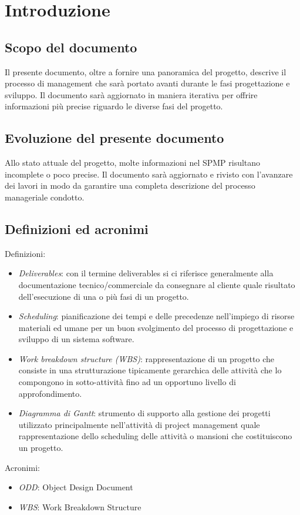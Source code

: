 \chapter{Introduzione}

\section{Scopo del documento}
		
Il presente documento, oltre a fornire una panoramica del progetto, descrive il processo di management che sarà portato avanti durante le fasi progettazione e sviluppo. Il documento sarà aggiornato in maniera iterativa per offrire informazioni più precise riguardo le diverse fasi del progetto. 


\section{Evoluzione del presente documento}

Allo stato attuale del progetto, molte informazioni nel SPMP risultano incomplete o poco precise. Il documento sarà aggiornato e rivisto con l'avanzare dei lavori in modo da garantire una completa descrizione del processo manageriale condotto.


\section{Definizioni ed acronimi}

Definizioni:			
\begin{itemize}
\item \emph{Deliverables}: con il termine deliverables si ci riferisce generalmente alla documentazione tecnico/commerciale da consegnare al cliente quale risultato dell'esecuzione di una o più fasi di un progetto.
\item \emph{Scheduling}: pianificazione dei tempi e delle precedenze nell'impiego di risorse materiali ed umane per un buon svolgimento del processo di progettazione e sviluppo di un sistema software.
\item \emph{Work breakdown structure (WBS)}: rappresentazione di un progetto che consiste in una strutturazione tipicamente gerarchica delle attività che lo compongono in sotto-attività fino ad un opportuno livello di approfondimento.
\item \emph{Diagramma di Gantt}: strumento di supporto alla gestione dei progetti utilizzato principalmente nell'attività di project management quale rappresentazione dello scheduling delle attività o mansioni che costituiscono un progetto.
\end{itemize}	

Acronimi:
\begin{itemize}
\item \emph{ODD}: Object Design Document
\item \emph{WBS}: Work Breakdown Structure
\end{itemize}
